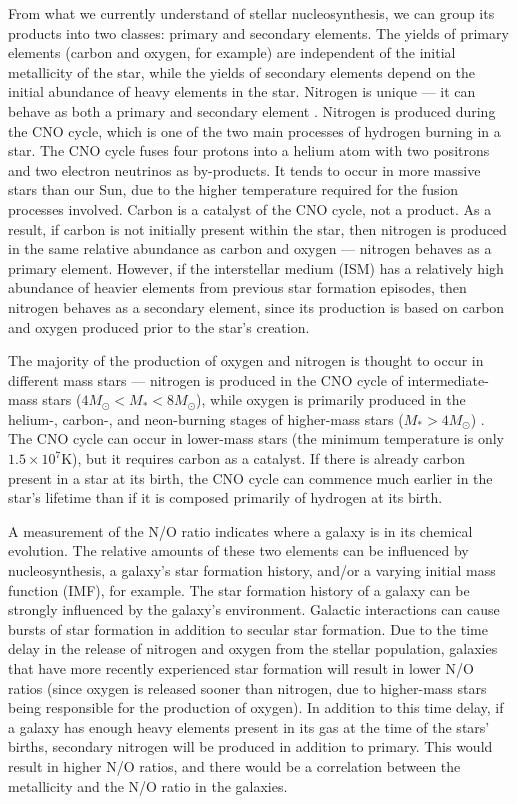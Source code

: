 From what we currently understand of stellar nucleosynthesis, we can group its 
products into two classes: primary and secondary elements.  The yields of 
primary elements (carbon and oxygen, for example) are independent of the initial 
metallicity of the star, while the yields of secondary elements depend on the 
initial abundance of heavy elements in the star.  Nitrogen is unique --- it can 
behave as both a primary and secondary element \citep{Matteucci86}.  Nitrogen is 
produced during the CNO cycle, which is one of the two main processes of 
hydrogen burning in a star.  The CNO cycle fuses four protons into a helium atom 
with two positrons and two electron neutrinos as by-products.  It tends to occur 
in more massive stars than our Sun, due to the higher temperature required for 
the fusion processes involved.  Carbon is a catalyst of the CNO cycle, not a 
product.  As a result, if carbon is not initially present within the star, then 
nitrogen is produced in the same relative abundance as carbon and oxygen --- 
nitrogen behaves as a primary element.  However, if the interstellar medium 
(ISM) has a relatively high abundance of heavier elements from previous star 
formation episodes, then nitrogen behaves as a secondary element, since its 
production is based on carbon and oxygen produced prior to the star's creation.

The majority of the production of oxygen and nitrogen is thought to occur in 
different mass stars --- nitrogen is produced in the CNO cycle of 
intermediate-mass stars ($4M_{\odot} < M_* < 8M_{\odot}$), while oxygen is 
primarily produced in the helium-, carbon-, and neon-burning stages of 
higher-mass stars ($M_* > 4M_{\odot}$) \citep{Henry00,Henry06}.  The CNO cycle 
can occur in lower-mass stars (the minimum temperature is only 
$1.5\times 10^7$K), but it requires carbon as a catalyst.  If there is already 
carbon present in a star at its birth, the CNO cycle can commence much earlier 
in the star's lifetime than if it is composed primarily of hydrogen at its 
birth.

A measurement of the N/O ratio indicates where a galaxy is in its chemical 
evolution.  The relative amounts of these two elements can be influenced by 
nucleosynthesis, a galaxy's star formation history, and/or a varying initial 
mass function (IMF), for example.  The star formation history of a galaxy can be 
strongly influenced by the galaxy's environment.  Galactic interactions can 
cause bursts of star formation in addition to secular star formation.  Due to 
the time delay in the release of nitrogen and oxygen from the stellar 
population, galaxies that have more recently experienced star formation will 
result in lower N/O ratios (since oxygen is released sooner than nitrogen, due 
to higher-mass stars being responsible for the production of oxygen).  In 
addition to this time delay, if a galaxy has enough heavy elements present in 
its gas at the time of the stars' births, secondary nitrogen will be produced in 
addition to primary.  This would result in higher N/O ratios, and there would be 
a correlation between the metallicity and the N/O ratio in the galaxies.


